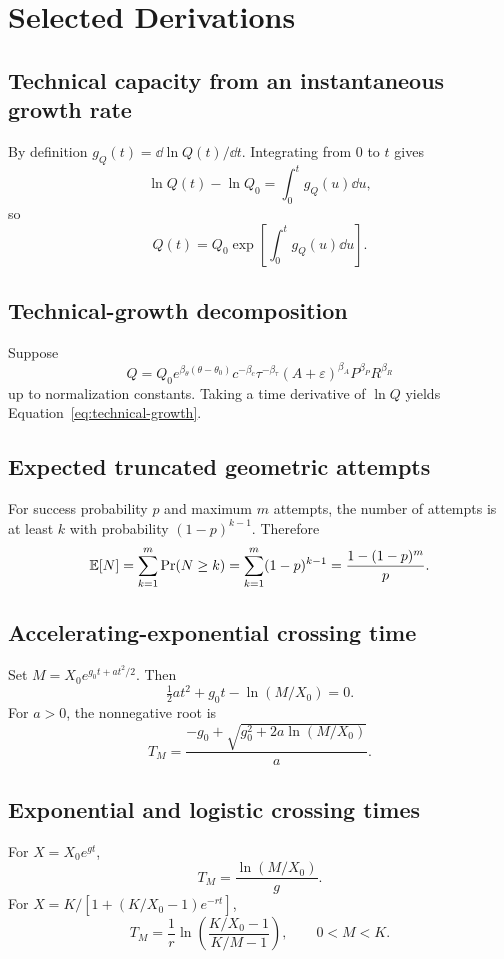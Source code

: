 
\section{Selected Derivations}
\label{app:derivations}

\subsection{Technical capacity from an instantaneous growth rate}

By definition $g_Q(t)=\dd\ln Q(t)/\dd t$. Integrating from 0 to $t$ gives
\[
\ln Q(t)-\ln Q_0=\int_0^t g_Q(u)\dd u,
\]
so
\[
Q(t)=Q_0\exp\left[\int_0^t g_Q(u)\dd u\right].
\]

\subsection{Technical-growth decomposition}

Suppose
\[
Q=Q_0e^{\beta_\theta(\theta-\theta_0)}c^{-\beta_c}\tau^{-\beta_\tau}(A+\varepsilon)^{\beta_A}P^{\beta_P}R^{\beta_R}
\]
up to normalization constants. Taking a time derivative of $\ln Q$ yields Equation~\eqref{eq:technical-growth}.

\subsection{Expected truncated geometric attempts}

For success probability $p$ and maximum $m$ attempts, the number of attempts is at least $k$ with probability $(1-p)^{k-1}$. Therefore
\[
\mathbb{E}[N]=\sum_{k=1}^{m}\Pr(N\ge k)=\sum_{k=1}^{m}(1-p)^{k-1}=\frac{1-(1-p)^m}{p}.
\]

\subsection{Accelerating-exponential crossing time}

Set $M=X_0e^{g_0t+at^2/2}$. Then
\[
\tfrac12at^2+g_0t-\ln(M/X_0)=0.
\]
For $a>0$, the nonnegative root is
\[
T_M=\frac{-g_0+\sqrt{g_0^2+2a\ln(M/X_0)}}{a}.
\]

\subsection{Exponential and logistic crossing times}

For $X=X_0e^{gt}$,
\[
T_M=\frac{\ln(M/X_0)}{g}.
\]
For $X=K/[1+(K/X_0-1)e^{-rt}]$,
\[
T_M=\frac1r\ln\left(\frac{K/X_0-1}{K/M-1}\right),\qquad 0<M<K.
\]

